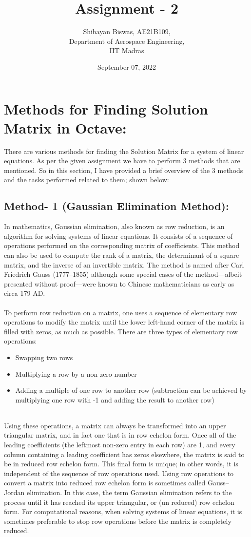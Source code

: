 \documentclass[12pt,a4paper]{article}
\author{Shibayan Biswas, AE21B109,\\ Department of Aerospace Engineering,\\ IIT Madras}
\title{Assignment - 2}
\date{September 07, 2022}
\begin{document}
\maketitle
\hline
\section{Methods for Finding Solution Matrix in Octave:}
There are various methods for finding the Solution Matrix for a system of linear equations. As per the given assignment we have to perform 3 methods that are mentioned. So in this section, I have provided a brief overview of the 3 methods and the tasks performed related to them; shown below:
\subsection{Method- 1 (Gaussian Elimination Method):}
In mathematics, Gaussian elimination, also known as row reduction, is an algorithm for solving systems of linear equations. It consists of a sequence of operations performed on the corresponding matrix of coefficients. This method can also be used to compute the rank of a matrix, the determinant of a square matrix, and the inverse of an invertible matrix. The method is named after Carl Friedrich Gauss (1777–1855) although some special cases of the method—albeit presented without proof—were known to Chinese mathematicians as early as circa 179 AD.\\
\\To perform row reduction on a matrix, one uses a sequence of elementary row operations to modify the matrix until the lower left-hand corner of the matrix is filled with zeros, as much as possible. There are three types of elementary row operations:
\begin{itemize}
\item Swapping two rows
\item Multiplying a row by a non-zero number
\item Adding a multiple of one row to another row (subtraction can be achieved by multiplying one row with -1 and adding the result to another row)
\end{itemize}
\\Using these operations, a matrix can always be transformed into an upper triangular matrix, and in fact one that is in row echelon form. Once all of the leading coefficients (the leftmost non-zero entry in each row) are 1, and every column containing a leading coefficient has zeros elsewhere, the matrix is said to be in reduced row echelon form. This final form is unique; in other words, it is independent of the sequence of row operations used. Using row operations to convert a matrix into reduced row echelon form is sometimes called Gauss–Jordan elimination. In this case, the term Gaussian elimination refers to the process until it has reached its upper triangular, or (un reduced) row echelon form. For computational reasons, when solving systems of linear equations, it is sometimes preferable to stop row operations before the matrix is completely reduced.
\end{document}
